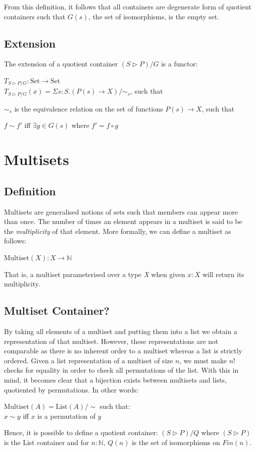 \documentclass[12pt]{report}
\begin{document}
 From this definition, it follows that all containers are degenerate form of quotient containers such that $G(s)$, the set of isomorphisms, is the empty set. 

\section{Extension}
The extension of a quotient container $(S \rhd P)/G$ is a functor:
\begin{center}
$T_{S \rhd P/G} : \text{Set} \rightarrow \text{Set}$\\
$T_{S \rhd P/G}(x) = \Sigma s:S.(P(s) \rightarrow X)/\sim_{s}$, such that\\
\end{center}
$\sim_{s}$ is the equivalence relation on the set of functions $P(s) \rightarrow X$, such that
\begin{center}
$f \sim f'$ iff $\exists g \in G(s)$ where $f' = f \circ g$
\end{center}

\chapter{Multisets}
\section{Definition}
Multisets are generalised notions of sets such that members can appear more than once. The number of times an element appears in a multiset is said to be the \textit{multiplicity} of that element. More formally, we can define a multiset as follows:
\begin{center}
$\text{Multiset}(X) : X \to \mathbb{N}$ 
\end{center}
That is, a multiset parameterised over a type \textit{X} when given $x:X$ will return its multiplicity. 
\section{Multiset Container?}
By taking all elements of a multiset and putting them into a list we obtain a representation of that multiset. However, these representations are not comparable as there is no inherent order to a multiset whereas a list is strictly ordered. Given a list representation of a multiset of size $n$, we must make $n!$ checks for equality in order to check all permutations of the list. With this in mind, it becomes clear that a bijection exists between multisets and lists, quotiented by permutations. In other words:
\begin{center}
$\text{Multiset}(A) = \text{List}(A)/\sim$ such that:\\
$x \sim y$ iff $x$ is a permutation of $y$
\end{center}
Hence, it is possible to define a quotient container: $(S \rhd P)/Q$ where $(S \rhd P)$ is the List container and for $n:\mathbb{N}$, $Q(n)$ is the set of isomorphisms on $Fin(n)$.
\end{document}
